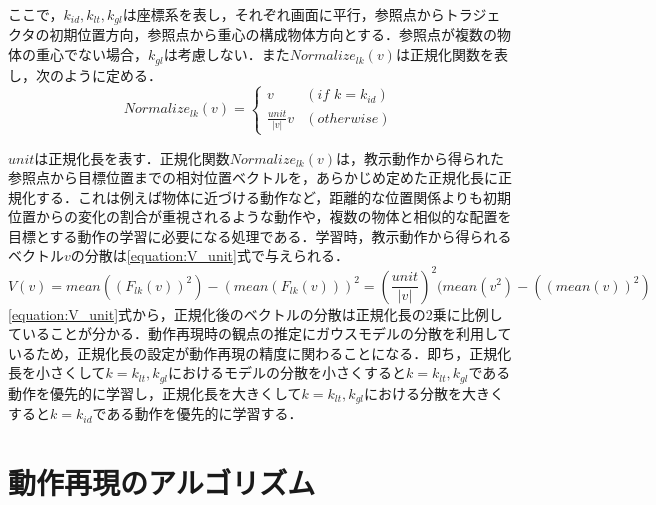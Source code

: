 ここで，$k_{id} , k_{lt} , k_{gl}$は座標系を表し，それぞれ画面に平行，参照点からトラジェクタの初期位置方向，参照点から重心の構成物体方向とする．参照点が複数の物体の重心でない場合，$k_{gl}$は考慮しない．また$Normalize_{lk}(v)$は正規化関数を表し，次のように定める．
\[
	Normalize_{lk}(v) = 
	\begin{cases}
		v & (if\,\,k=k_{id}) \\
		\frac{unit}{|v|}v & (otherwise)
	\end{cases}
\]

$unit$は正規化長を表す．正規化関数$Normalize_{lk}(v)$は，教示動作から得られた参照点から目標位置までの相対位置ベクトルを，あらかじめ定めた正規化長に正規化する．これは例えば物体に近づける動作など，距離的な位置関係よりも初期位置からの変化の割合が重視されるような動作や，複数の物体と相似的な配置を目標とする動作の学習に必要になる処理である．学習時，教示動作から得られるベクトル$v$の分散は\ref{equation:V_unit}式で与えられる．
\begin{equation}
	\label{equation:V_unit}
	V(v) = mean((F_{lk}(v))^{2}) - (mean(F_{lk}(v)))^{2} = \left(\frac{unit}{|v|}\right)^{2}(mean(v^{2}) - ((mean(v))^{2})
\end{equation}
\ref{equation:V_unit}式から，正規化後のベクトルの分散は正規化長の2乗に比例していることが分かる．動作再現時の観点の推定にガウスモデルの分散を利用しているため，正規化長の設定が動作再現の精度に関わることになる．即ち，正規化長を小さくして$k=k_{lt} , k_{gl}$におけるモデルの分散を小さくすると$k=k_{lt} , k_{gl}$である動作を優先的に学習し，正規化長を大きくして$k=k_{lt} , k_{gl}$における分散を大きくすると$k=k_{id}$である動作を優先的に学習する．


\section{動作再現のアルゴリズム}

